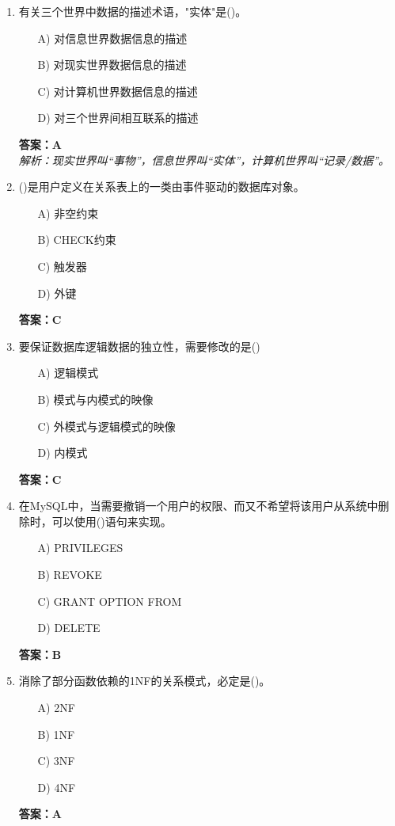 \documentclass[a4paper,12pt]{article}
\begin{document}
\begin{enumerate}[label=\arabic*.]
\item 有关三个世界中数据的描述术语，"实体"是()。
\begin{itemize}
    \item[A)] 对信息世界数据信息的描述
    \item[B)] 对现实世界数据信息的描述
    \item[C)] 对计算机世界数据信息的描述
    \item[D)] 对三个世界间相互联系的描述
\end{itemize}
\textbf{答案：A} \\
\textit{解析：现实世界叫“事物”，信息世界叫“实体”，计算机世界叫“记录/数据”。}

\item ()是用户定义在关系表上的一类由事件驱动的数据库对象。
\begin{itemize}
    \item[A)] 非空约束
    \item[B)] CHECK约束
    \item[C)] 触发器
    \item[D)] 外键
\end{itemize}
\textbf{答案：C}

\item 要保证数据库逻辑数据的独立性，需要修改的是()
\begin{itemize}
    \item[A)] 逻辑模式
    \item[B)] 模式与内模式的映像
    \item[C)] 外模式与逻辑模式的映像
    \item[D)] 内模式
\end{itemize}
\textbf{答案：C}

\item 在MySQL中，当需要撤销一个用户的权限、而又不希望将该用户从系统中删除时，可以使用()语句来实现。
\begin{itemize}
    \item[A)] PRIVILEGES
    \item[B)] REVOKE
    \item[C)] GRANT OPTION FROM
    \item[D)] DELETE
\end{itemize}
\textbf{答案：B}

\item 消除了部分函数依赖的1NF的关系模式，必定是()。
\begin{itemize}
    \item[A)] 2NF
    \item[B)] 1NF
    \item[C)] 3NF
    \item[D)] 4NF
\end{itemize}
\textbf{答案：A}


\end{enumerate}
\end{document}

